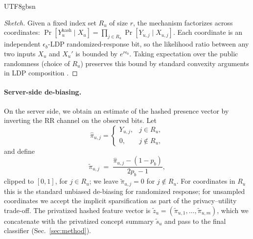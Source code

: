 \documentclass[lettersize,journal]{IEEEtran}
\begin{document}
\begin{CJK*}{UTF8}{gbsn}
\begin{proof}[Sketch]
Given a fixed index set $R_u$ of size $r$, the mechanism factorizes across coordinates:
\(
  \Pr[Y^{\text{hash}}_u \mid X_u]
  = \prod_{j \in R_u} \Pr[Y_{u,j} \mid X_{u,j}].
\)
Each coordinate is an independent $\epsilon_b$-LDP randomized-response bit, so the likelihood ratio between any two inputs $X_u$ and $X_u'$ is bounded by $e^{r\epsilon_b}$. Taking expectation over the public randomness (choice of $R_u$) preserves this bound by standard convexity arguments in LDP composition \cite{duchi2013localprivacy,kairouz2015composition}.
\end{proof}

\paragraph{Server-side de-biasing.}
On the server side, we obtain an estimate of the hashed presence vector by inverting the RR channel on the observed bits. Let
\[
  \hat{\pi}_{u,j} =
  \begin{cases}
    Y_{u,j}, & j \in R_u,\\
    0,       & j \notin R_u,
  \end{cases}
\]
and define
\begin{equation}
  \tilde{\pi}_{u,j}
  \;=\; \frac{\hat{\pi}_{u,j} - (1-p_b)}{2p_b - 1},
\end{equation}
clipped to $[0,1]$, for $j \in R_u$; we leave $\tilde{\pi}_{u,j}{=}0$ for $j \notin R_u$. For coordinates in $R_u$ this is the standard unbiased de-biasing for randomized response; for unsampled coordinates we accept the implicit sparsification as part of the privacy--utility trade-off. The privatized hashed feature vector is $\tilde{z}_u = (\tilde{\pi}_{u,1},\dots,\tilde{\pi}_{u,m})$, which we concatenate with the privatized concept summary $\tilde{s}_u$ and pass to the final classifier (Sec.~\ref{sec:method}).


\end{CJK*}
\end{document}
